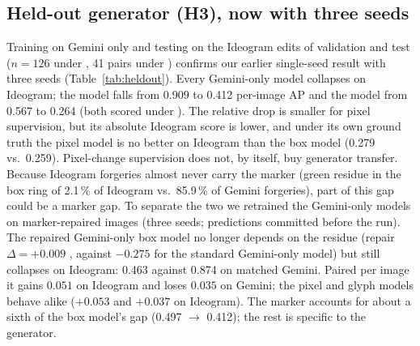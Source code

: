 \subsection{Held-out generator (H3), now with three seeds}
\label{sec:res-heldout}
Training on Gemini only and testing on the Ideogram edits of validation and test ($n{=}126$ under \GTb, 41 pairs under \GTp) confirms our earlier single-seed result with three seeds (Table~\ref{tab:heldout}). Every Gemini-only model collapses on Ideogram; the \GTb{} model falls from 0.909 to 0.412 per-image AP and the \GTp{} model from 0.567 to 0.264 (both scored under \GTb). The relative drop is smaller for pixel supervision, but its absolute Ideogram score is lower, and under its own ground truth the pixel model is no better on Ideogram than the box model (0.279 vs.\ 0.259). Pixel-change supervision does not, by itself, buy generator transfer. Because Ideogram forgeries almost never carry the marker (green residue in the box ring of 2.1\,\% of Ideogram vs.\ 85.9\,\% of Gemini forgeries), part of this gap could be a marker gap. To separate the two we retrained the Gemini-only models on marker-repaired images (three seeds; predictions committed before the run). The repaired Gemini-only box model no longer depends on the residue (repair $\Delta{=}+0.009$ , against $-0.275$ for the standard Gemini-only model) but still collapses on Ideogram: 0.463 against 0.874 on matched Gemini. Paired per image it gains $0.051$  on Ideogram and loses $0.035$  on Gemini; the pixel and glyph models behave alike ($+0.053$ and $+0.037$ on Ideogram). The marker accounts for about a sixth of the box model's gap (0.497 $\rightarrow$ 0.412); the rest is specific to the generator.

